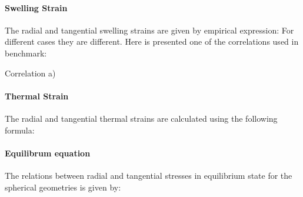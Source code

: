 \documentclass[review]{elsarticle}
\begin{document}
\paragraph{Swelling Strain} The radial and tangential swelling strains are given by  empirical expression: 
For different cases they are different. Here is presented one of the correlations used in benchmark:

Correlation a)
\StrainSwelling


\paragraph{Thermal Strain} The radial and tangential thermal strains are calculated using the following formula:
\StrainThermal 

\paragraph{Equilibrum equation} The relations between radial and tangential stresses in equilibrium state for the spherical geometries is given by:
\EquilibrumStress 
\end{document}
